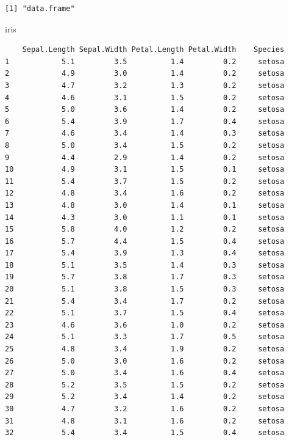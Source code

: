 \documentclass[
  brazilian,
]{book}
\newenvironment{Shaded}{\begin{snugshade}}{\end{snugshade}}
\newcommand{\NormalTok}[1]{#1}
\begin{document}
\begin{verbatim}
[1] "data.frame"
\end{verbatim}

\begin{Shaded}
\begin{Highlighting}[]
\NormalTok{iris}
\end{Highlighting}
\end{Shaded}

\begin{verbatim}
    Sepal.Length Sepal.Width Petal.Length Petal.Width    Species
1            5.1         3.5          1.4         0.2     setosa
2            4.9         3.0          1.4         0.2     setosa
3            4.7         3.2          1.3         0.2     setosa
4            4.6         3.1          1.5         0.2     setosa
5            5.0         3.6          1.4         0.2     setosa
6            5.4         3.9          1.7         0.4     setosa
7            4.6         3.4          1.4         0.3     setosa
8            5.0         3.4          1.5         0.2     setosa
9            4.4         2.9          1.4         0.2     setosa
10           4.9         3.1          1.5         0.1     setosa
11           5.4         3.7          1.5         0.2     setosa
12           4.8         3.4          1.6         0.2     setosa
13           4.8         3.0          1.4         0.1     setosa
14           4.3         3.0          1.1         0.1     setosa
15           5.8         4.0          1.2         0.2     setosa
16           5.7         4.4          1.5         0.4     setosa
17           5.4         3.9          1.3         0.4     setosa
18           5.1         3.5          1.4         0.3     setosa
19           5.7         3.8          1.7         0.3     setosa
20           5.1         3.8          1.5         0.3     setosa
21           5.4         3.4          1.7         0.2     setosa
22           5.1         3.7          1.5         0.4     setosa
23           4.6         3.6          1.0         0.2     setosa
24           5.1         3.3          1.7         0.5     setosa
25           4.8         3.4          1.9         0.2     setosa
26           5.0         3.0          1.6         0.2     setosa
27           5.0         3.4          1.6         0.4     setosa
28           5.2         3.5          1.5         0.2     setosa
29           5.2         3.4          1.4         0.2     setosa
30           4.7         3.2          1.6         0.2     setosa
31           4.8         3.1          1.6         0.2     setosa
32           5.4         3.4          1.5         0.4     setosa

\end{verbatim}
\end{document}
